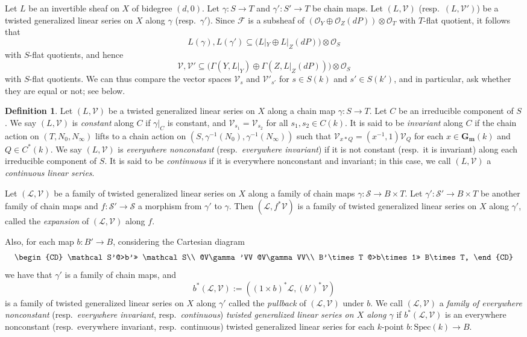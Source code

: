 \documentclass[a4paper,11pt]{amsart}
\theoremstyle{plain}
\theoremstyle{definition}
\newtheorem{defn}[thm]{Definition}
\theoremstyle{remark}
\def\cc{{\mathbf G}_{\mathbf m}}
\def\L{\mathcal{L}}
\def\O{\mathcal{O}}
\def\V{\mathcal{V}}
\def\F{\mathcal{F}}
\def\:{\colon}
\begin{document}
Let $L$ be an invertible sheaf on $X$ of bidegree $(d,0)$. Let $\gamma\:S\to T$ and $\gamma'\:S'\to T$ be chain maps. Let $(L,\V)$ (resp.~$(L,\V')$) be a twisted generalized linear series on $X$ along $\gamma$ (resp.~$\gamma'$). Since $\F$ is a subsheaf of $(\O_Y\oplus\O_Z(dP))\otimes\O_T$ with $T$-flat quotient, it follows that 
\[
L(\gamma),L(\gamma')\subseteq \big(L|_Y\oplus L|_Z(dP)\big)\otimes\O_{S}
\]
with $S$-flat quotients, and hence 
\[
\V,\V'\subseteq \big(\Gamma(Y,L|_Y)\oplus\Gamma(Z,L|_Z(dP))\big)\otimes\O_{S}
\]
with $S$-flat quotients. We can thus compare the vector spaces $\V_{s}$ and $\V'_{s'}$ for $s\in S(k)$ and $s'\in S(k')$, and in particular, ask whether they are equal or not; see below. 

\begin{defn}\label{inv-const} Let $(L,\V)$ be a twisted generalized linear series on $X$ along a chain map $\gamma\: S\to T$. Let $C$ be an irreducible component of $S$. We say $(L,\V)$ is \emph{constant} along $C$ if $\gamma|_C$ is constant, and $\V_{s_1}=\V_{s_2}$ for all $s_1,s_2\in C(k)$. It is said to be \emph{invariant} along $C$ if the chain action on $(T,N_0,N_\infty)$ lifts to a chain action on $(S,\gamma^{-1}(N_0),\gamma^{-1}(N_\infty))$ such that $\V_{x\ast Q}=(x^{-1},1)\V_{Q}$ for each $x\in\cc(k)$ and $Q\in C^*(k)$. We say $(L,\V)$ is \emph{everywhere nonconstant} (resp.~\emph{everywhere invariant}) if it is not constant (resp.~it is invariant) along each irreducible component of $S$. It is said to be \emph{continuous} if it is everywhere nonconstant and invariant; in this case, we call $(L,\V)$ a \emph{continuous linear series}.
\end{defn}

Let $(\L,\mathcal{V})$ be a family of twisted generalized linear series on $X$ along a family of chain maps $\gamma\:\mathcal S\to B\times T$. Let $\gamma'\:\mathcal S'\to B\times T$ be another family of chain maps and $f\colon\mathcal S'\to\mathcal S$ a morphism from $\gamma'$ to $\gamma$. Then $(\L,f^*\V)$ is a family of twisted generalized linear series on $X$ along $\gamma'$, called the \emph{expansion} of $(\L,\V)$ along $f$. 

Also, for each map $b\:B'\to B$, considering the Cartesian diagram
\[
\begin{CD}
    \mathcal S'@>b'>> \mathcal S\\
    @V\gamma'VV @V\gamma VV\\
    B'\times T @>b\times 1>> B\times T,
\end{CD}
\]
we have that $\gamma'$ is a family of chain maps, and 
\[
b^*(\L,\V):=((1\times b)^*\L,(b')^*\V)
\]
is a family of twisted generalized linear series on $X$ along $\gamma'$ called the \emph{pullback} of $(\L,\V)$ under $b$. We call $(\L,\mathcal V)$ a \emph{family of everywhere nonconstant} (resp.~\emph{everywhere invariant}, resp.~\emph{continuous}) \emph{twisted generalized linear series on $X$ along $\gamma$} if $b^*(\L,\V)$ is an everywhere nonconstant (resp.~everywhere invariant, resp.~continuous) twisted generalized linear series for each $k$-point $b\:\text{Spec}(k)\to B$.
\end{document}
